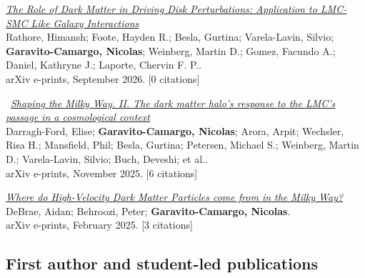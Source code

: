 \documentclass[14pt]{article}
\begin{document}
\begin{etaremune}
\item \textit{\href{https://ui.adsabs.harvard.edu/abs/2026arXiv260907867R/abstract}{The Role of Dark Matter in Driving Disk Perturbations: Application to LMC-SMC Like Galaxy Interactions}}\\
  {\small \color{darkgray} Rathore, Himansh; Foote, Hayden R.; Besla, Gurtina; Varela-Lavin, Silvio; \textbf{Garavito-Camargo, Nicolas}; Weinberg, Martin D.; Gomez, Facundo A.; Daniel, Kathryne J.; Laporte, Chervin F. P..\\
  arXiv e-prints, September 2026. [0 citations]}

\item \dag\ \textit{\href{https://ui.adsabs.harvard.edu/abs/2025arXiv251102031D/abstract}{Shaping the Milky Way. II. The dark matter halo's response to the LMC's passage in a cosmological context}}\\
  {\small \color{darkgray} Darragh-Ford, Elise; \textbf{Garavito-Camargo, Nicolas}; Arora, Arpit; Wechsler, Risa H.; Mansfield, Phil; Besla, Gurtina; Petersen, Michael S.; Weinberg, Martin D.; Varela-Lavin, Silvio; Buch, Deveshi; et al..\\
  arXiv e-prints, November 2025. [6 citations]}

\item \textit{\href{https://ui.adsabs.harvard.edu/abs/2025arXiv250217565D/abstract}{Where do High-Velocity Dark Matter Particles come from in the Milky Way?}}\\
  {\small \color{darkgray} DeBrae, Aidan; Behroozi, Peter; \textbf{Garavito-Camargo, Nicolas}.\\
  arXiv e-prints, February 2025. [3 citations]}

\end{etaremune}

\subsection*{First author and student-led publications}
\end{document}
